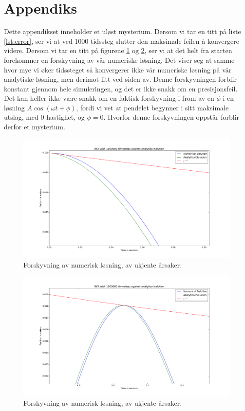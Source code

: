 \documentclass[12p,a4paper]{article}
\begin{document}
\section*{Appendiks}
Dette appendikset inneholder et uløst mysterium. Dersom vi tar en titt på liste \ref{lst:error}, ser vi at ved 1000 tidssteg slutter den maksimale feilen å konvergere videre. Dersom vi tar en titt på figurene \ref{fig:mysterium} og \ref{fig:mysterium2}, ser vi at det helt fra starten forekommer en forskyvning av vår numeriske løsning. Det viser seg at samme hvor mye vi øker tidssteget så konvergerer ikke vår numeriske løsning på vår analytiske løsning, men derimot litt ved siden av. Denne forskyvningen forblir konstant gjennom hele simuleringen, og det er ikke snakk om en presisjonsfeil. Det kan heller ikke være snakk om en faktisk forskyvning i from av en $\phi$ i en løsning $A\cos(\omega t + \phi)$, fordi vi vet at pendelet begynner i sitt maksimale utslag, med 0 hastighet, og $\phi = 0$. Hvorfor denne forskyvningen oppstår forblir derfor et mysterium.

\begin{figure}[H]
\includegraphics[width=\textwidth]{fig/Mysterium.pdf}
\caption{Forskyvning av numerisk løsning, av ukjente årsaker.}
\label{fig:mysterium}
\end{figure}

\begin{figure}[H]
\includegraphics[width=\textwidth]{fig/Mysterium2.pdf}
\caption{Forskyvning av numerisk løsning, av ukjente årsaker.}
\label{fig:mysterium2}
\end{figure}
\end{document}
